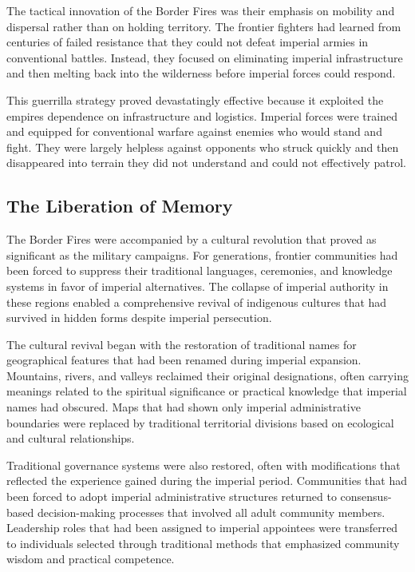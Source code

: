 The tactical innovation of the Border Fires was their emphasis on
mobility and dispersal rather than on holding territory. The frontier
fighters had learned from centuries of failed resistance that they could
not defeat imperial armies in conventional battles. Instead, they
focused on eliminating imperial infrastructure and then melting back
into the wilderness before imperial forces could respond.

This guerrilla strategy proved devastatingly effective because it
exploited the empire\textquotesingle s dependence on infrastructure and
logistics. Imperial forces were trained and equipped for conventional
warfare against enemies who would stand and fight. They were largely
helpless against opponents who struck quickly and then disappeared into
terrain they did not understand and could not effectively patrol.

\subsection{The Liberation of Memory}\label{the-liberation-of-memory}

The Border Fires were accompanied by a cultural revolution that proved
as significant as the military campaigns. For generations, frontier
communities had been forced to suppress their traditional languages,
ceremonies, and knowledge systems in favor of imperial alternatives. The
collapse of imperial authority in these regions enabled a comprehensive
revival of indigenous cultures that had survived in hidden forms despite
imperial persecution.

The cultural revival began with the restoration of traditional names for
geographical features that had been renamed during imperial expansion.
Mountains, rivers, and valleys reclaimed their original designations,
often carrying meanings related to the spiritual significance or
practical knowledge that imperial names had obscured. Maps that had
shown only imperial administrative boundaries were replaced by
traditional territorial divisions based on ecological and cultural
relationships.

Traditional governance systems were also restored, often with
modifications that reflected the experience gained during the imperial
period. Communities that had been forced to adopt imperial
administrative structures returned to consensus-based decision-making
processes that involved all adult community members. Leadership roles
that had been assigned to imperial appointees were transferred to
individuals selected through traditional methods that emphasized
community wisdom and practical competence.

